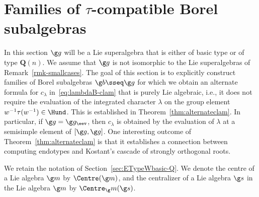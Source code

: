 \documentclass[12pt]{amsart}
\begin{document}
\section{Families of  $\tau$-compatible Borel subalgebras}
\label{sec:tau-compatible-parab}
In this section  $\g g$ will be a Lie superalgebra that is either of basic type or of type $\mathbf Q(n)$. We assume that $\g g$ is not isomorphic to the Lie superalgebras of Remark~\ref{rmk-smallcases}.  
The goal of this section is to explicitly construct families of Borel subalgebras $\g b\sseq \g g$ for which we obtain an alternate formula for  $c_\lambda$ in~\eqref{eq:lambdaB-clam} that is purely Lie algebraic, i.e., it does not require the evaluation of the integrated character $\lambda$ on the  group element $w^{-1}\tau(w^{-1})\in\Hund$. This is established in Theorem~\ref{thm:alternateclam}. In particular, if $\g g=\g g_\eev$, then $c_\lambda$ is obtained by the evaluation of $\lambda$  at a semisimple element of  $[\g g,\g g]$. One interesting outcome  of Theorem~\ref{thm:alternateclam} is that it establishes a connection between computing endotypes and Kostant's cascade of strongly orthogonal roots. 


We retain the notation of 
Section~\ref{sec:ETypeWbasic-Q}. 
We denote the centre of a Lie algebra $\g m$ by $\Centre(\g m)$, and the centralizer of a Lie algebra $\g s$ in the Lie algebra $\g m$ by $\Centre_\g m(\g s)$. 
\end{document}
